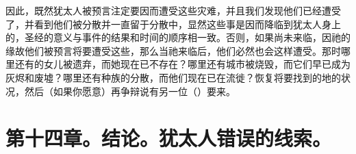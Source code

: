 因此，既然犹太人被预言注定要因而遭受这些灾难，并且我们发现他们已经遭受了，并看到他们被分散并一直留于分散中，显然这些事是因而降临到犹太人身上的，圣经的意义与事件的结果和时间的顺序相一致。否则，如果尚未来临，因祂的缘故他们被预言将要遭受这些，那么当祂来临后，他们必然也会这样遭受。那时哪里还有的女儿被遗弃，而她现在已不存在？哪里还有城市被烧毁，而它们早已成为灰烬和废墟？哪里还有种族的分散，而他们现在已在流徙？恢复将要找到的地的状况，然后（如果你愿意）再争辩说有另一位（）要来。\par


\section{第十四章。结论。犹太人错误的线索。}

